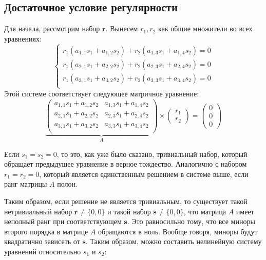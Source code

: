 \subsection{Достаточное условие регулярности}

Для начала, рассмотрим набор $\mathbf{r}$. Вынесем $r_1, r_2$ как общие множители во всех уравнениях:
\begin{equation}\label{eq:trivial_r}
	\begin{cases}
		r_1(a_{1,1} s_1 + a_{1,2} s_2) + r_2(a_{1,3} s_1 + a_{1,4} s_2) = 0 \\
		r_1(a_{2,1} s_1 + a_{2,2} s_2) + r_2(a_{2,3} s_1 + a_{2,4} s_2) = 0 \\
		r_1(a_{3,1} s_1 + a_{3,2} s_2) + r_2(a_{3,3} s_1 + a_{3,4} s_2) = 0 \\
	\end{cases}
\end{equation}
Этой системе соответствует следующее матричное уравнение:
$$
	\underbrace{
	\begin{pmatrix}
		a_{1,1} s_1 + a_{1,2} s_2 & a_{1,3} s_1 + a_{1,4} s_2 \\
		a_{2,1} s_1 + a_{2,2} s_2 & a_{2,3} s_1 + a_{2,4} s_2 \\
		a_{3,1} s_1 + a_{3,2} s_2 & a_{3,3} s_1 + a_{3,4} s_2 \\
	\end{pmatrix}}_{A}
	\times
	\begin{pmatrix}
		r_1 \\
		r_2
	\end{pmatrix}=
	\begin{pmatrix}
		0 \\
		0 \\
		0
	\end{pmatrix}
$$

Если $s_1=s_2=0$, то это, как уже было сказано, тривиальный набор, который обращает предыдущее уравнение 
в верное тождество. Аналогично с набором $r_1 = r_2 = 0$, который является единственным решением в 
системе выше, если ранг матрицы $A$ полон. 

Таким образом, если решение не является тривиальным, то существует такой нетривиальный набор $\mathbf{r}
\ne \{0, 0\}$ и такой набор $\mathbf{s} \ne \{0, 0\}$, что матрица $A$ имеет неполный ранг при 
соответствующем $\mathbf{s}$. Это равносильно тому, что все миноры второго порядка в матрице $A$ 
обращаются в ноль. Вообще говоря, миноры будут квадратично зависеть от $\mathbf{s}$. Таким образом, можно 
составить нелинейную систему уравнений относительно $s_1$ и $s_2$: 

